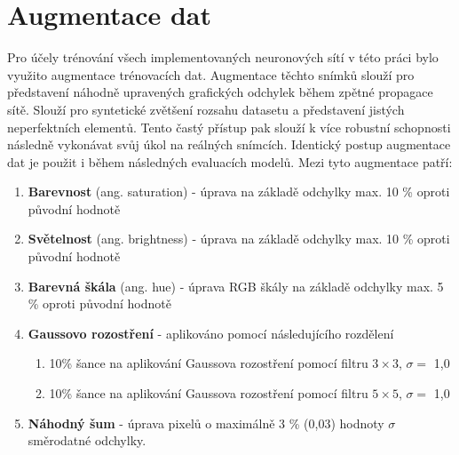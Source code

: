 \section{Augmentace dat}
\label{sec:Chapter41}
Pro účely trénování všech implementovaných neuronových sítí v této práci bylo využito augmentace trénovacích dat. Augmentace těchto snímků slouží pro představení náhodně upravených grafických odchylek během zpětné propagace sítě. Slouží pro syntetické zvětšení rozsahu datasetu a představení jistých neperfektních elementů. Tento častý přístup pak slouží k více robustní schopnosti následně vykonávat svůj úkol na reálných snímcích. Identický postup augmentace dat je použit i během následných evaluacích modelů. Mezi tyto augmentace patří:
\begin{enumerate}
  \item \textbf{Barevnost} (ang. saturation) - úprava na základě odchylky max. 10 \% oproti původní hodnotě
  \item \textbf{Světelnost} (ang. brightness) - úprava na základě odchylky max. 10 \% oproti původní hodnotě
  \item \textbf{Barevná škála} (ang. hue) - úprava RGB škály na základě odchylky max. 5 \% oproti původní hodnotě
  \item \textbf{Gaussovo rozostření} - aplikováno pomocí následujícího rozdělení
  \begin{enumerate}
      \item 10\% šance na aplikování Gaussova rozostření pomocí filtru $3\times3$, $\sigma=$ 1,0
      \item 10\% šance na aplikování Gaussova rozostření pomocí filtru $5\times5$, $\sigma=$ 1,0
  \end{enumerate}
  \item \textbf{Náhodný šum} - úprava pixelů o maximálně 3 \% (0,03) hodnoty $\sigma$ směrodatné odchylky.
\end{enumerate}
\endinput